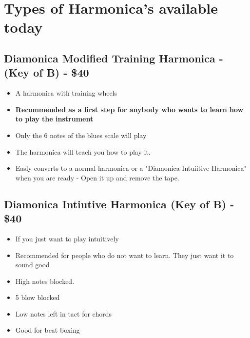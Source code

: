     \section*{Types of Harmonica's available today}
       \subsection*{Diamonica Modified Training Harmonica - (Key of B)  - \$40}
            \begin{itemize}
                \item A harmonica with training wheels
                \item \textbf{Recommended as a first step for anybody who wants to learn how to play the instrument}
                \item Only the 6 notes of the blues scale will play 
                \item The harmonica will teach you how to play it.
                \item Easly converts to a normal harmonica or a "Diamonica Intuiitive Harmonica" when you are ready - Open it up and remove the tape.
            \end{itemize}


        \subsection*{Diamonica Intiutive Harmonica (Key of B) - \$40}
            \begin{itemize}
                \item If you just want to play intuitively 
                \item Recommended for people who do not want to learn. They just want it to sound good
                \item High notes blocked. 
                \item 5 blow blocked 
                \item Low notes left in tact for chords
                \item Good for beat boxing
            \end{itemize}
            
